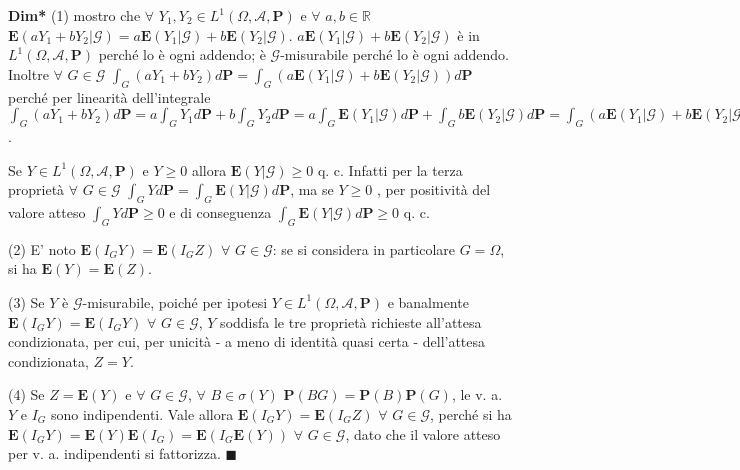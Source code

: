 \documentclass{article}
\begin{document}
\textbf{Dim*} (1) mostro che $\forall $ $Y_{1},Y_{2}\in L^{1}\left( \Omega ,%
\mathcal{A},\mathbf{P}\right) $ e $\forall $ $a,b\in 
\mathbb{R}
$ $\mathbf{E}\left( aY_{1}+bY_{2}|\mathcal{G}\right) =a\mathbf{E}\left(
Y_{1}|\mathcal{G}\right) +b\mathbf{E}\left( Y_{2}|\mathcal{G}\right) $. $a%
\mathbf{E}\left( Y_{1}|\mathcal{G}\right) +b\mathbf{E}\left( Y_{2}|\mathcal{G%
}\right) $ \`{e} in $L^{1}\left( \Omega ,\mathcal{A},\mathbf{P}\right) $
perch\'{e} lo \`{e} ogni addendo; \`{e} $\mathcal{G}$-misurabile perch\'{e}
lo \`{e} ogni addendo. Inoltre $\forall $ $G\in \mathcal{G}$ $\int_{G}\left(
aY_{1}+bY_{2}\right) d\mathbf{P}=\int_{G}\left( a\mathbf{E}\left( Y_{1}|%
\mathcal{G}\right) +b\mathbf{E}\left( Y_{2}|\mathcal{G}\right) \right) d%
\mathbf{P}$ perch\'{e} per linearit\`{a} dell'integrale $\int_{G}\left(
aY_{1}+bY_{2}\right) d\mathbf{P=}a\int_{G}Y_{1}d\mathbf{P+}b\int_{G}Y_{2}d%
\mathbf{P=}a\int_{G}\mathbf{E}\left( Y_{1}|\mathcal{G}\right) d\mathbf{P}%
+\int_{G}b\mathbf{E}\left( Y_{2}|\mathcal{G}\right) d\mathbf{P=}%
\int_{G}\left( a\mathbf{E}\left( Y_{1}|\mathcal{G}\right) +b\mathbf{E}\left(
Y_{2}|\mathcal{G}\right) \right) d\mathbf{P}$.

Se $Y\in L^{1}\left( \Omega ,\mathcal{A},\mathbf{P}\right) $ e $Y\geq 0$
allora $\mathbf{E}\left( Y|\mathcal{G}\right) \geq 0$ q. c. Infatti per la
terza propriet\`{a} $\forall $ $G\in \mathcal{G}$ $\int_{G}Yd\mathbf{P}%
=\int_{G}\mathbf{E}\left( Y|\mathcal{G}\right) d\mathbf{P}$, ma se $Y\geq 0$%
, per positivit\`{a} del valore atteso $\int_{G}Yd\mathbf{P}\geq 0$ e di
conseguenza $\int_{G}\mathbf{E}\left( Y|\mathcal{G}\right) d\mathbf{P}\geq 0$
q. c.

(2) E' noto $\mathbf{E}\left( I_{G}Y\right) =\mathbf{E}\left( I_{G}Z\right) $
$\forall $ $G\in \mathcal{G}$: se si considera in particolare $G=\Omega $,
si ha $\mathbf{E}\left( Y\right) =\mathbf{E}\left( Z\right) $.

(3) Se $Y$ \`{e} $\mathcal{G}$-misurabile, poich\'{e} per ipotesi $Y\in
L^{1}\left( \Omega ,\mathcal{A},\mathbf{P}\right) $ e banalmente $\mathbf{E}%
\left( I_{G}Y\right) =\mathbf{E}\left( I_{G}Y\right) $ $\forall $ $G\in 
\mathcal{G}$, $Y$ soddisfa le tre propriet\`{a} richieste all'attesa
condizionata, per cui, per unicit\`{a} - a meno di identit\`{a} quasi certa
- dell'attesa condizionata, $Z=Y$.

(4) Se $Z=\mathbf{E}\left( Y\right) $ e $\forall $ $G\in \mathcal{G}$, $%
\forall $ $B\in \sigma \left( Y\right) $ $\mathbf{P}\left( BG\right) =%
\mathbf{P}\left( B\right) \mathbf{P}\left( G\right) $, le v. a. $Y$ e $I_{G}$
sono indipendenti. Vale allora $\mathbf{E}\left( I_{G}Y\right) =\mathbf{E}%
\left( I_{G}Z\right) $ $\forall $ $G\in \mathcal{G}$, perch\'{e} si ha $%
\mathbf{E}\left( I_{G}Y\right) =\mathbf{E}\left( Y\right) \mathbf{E}\left(
I_{G}\right) =\mathbf{E}\left( I_{G}\mathbf{E}\left( Y\right) \right) $ $%
\forall $ $G\in \mathcal{G}$, dato che il valore atteso per v. a.
indipendenti si fattorizza. $\blacksquare $
\end{document}
